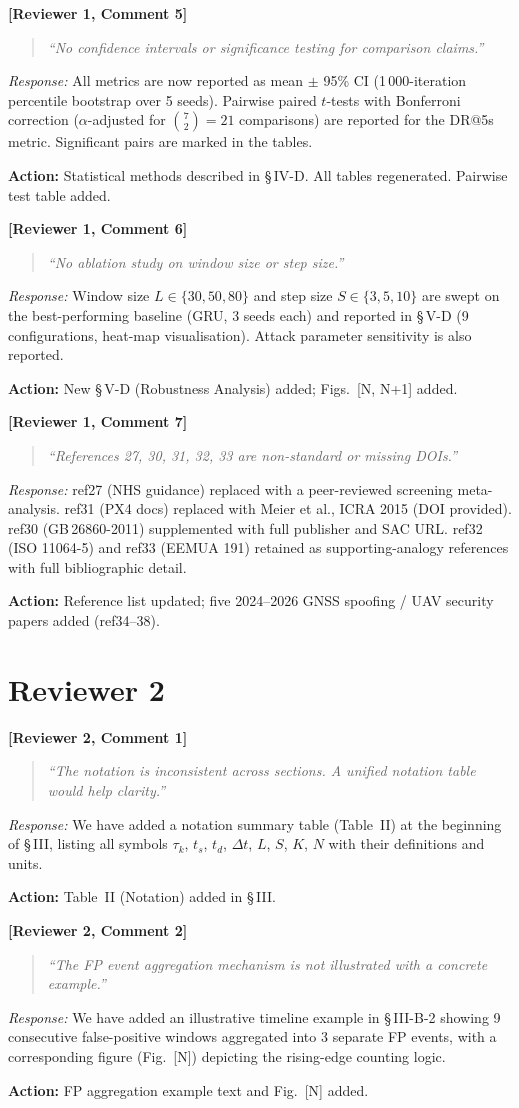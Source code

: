 \documentclass[11pt, a4paper]{article}
\newcommand{\reviewer}[2]{\medskip\noindent\textbf{\textcolor{revcolor}{[Reviewer #1, Comment #2]}}\par}
\newcommand{\response}[1]{\noindent\textit{Response:} #1\par}
\newcommand{\action}[1]{\noindent\textcolor{actcolor}{\textbf{Action:} #1}\smallskip\par}
\newcommand{\quoterev}[1]{\begin{quote}\textit{``#1''}\end{quote}}
\begin{document}
\reviewer{1}{5}
\quoterev{No confidence intervals or significance testing for comparison claims.}
\response{%
  All metrics are now reported as mean $\pm$ 95\% CI (1\,000-iteration
  percentile bootstrap over 5 seeds). Pairwise paired $t$-tests with Bonferroni
  correction ($\alpha$-adjusted for $\binom{7}{2}=21$ comparisons) are reported
  for the DR@5s metric. Significant pairs are marked in the tables.}
\action{Statistical methods described in \S\,IV-D. All tables regenerated.
  Pairwise test table added.}

\reviewer{1}{6}
\quoterev{No ablation study on window size or step size.}
\response{%
  Window size $L\in\{30,50,80\}$ and step size $S\in\{3,5,10\}$ are swept
  on the best-performing baseline (GRU, 3 seeds each) and reported in
  \S\,V-D (9 configurations, heat-map visualisation). Attack parameter
  sensitivity is also reported.}
\action{New \S\,V-D (Robustness Analysis) added; Figs.~[N, N+1] added.}

\reviewer{1}{7}
\quoterev{References 27, 30, 31, 32, 33 are non-standard or missing DOIs.}
\response{%
  ref27 (NHS guidance) replaced with a peer-reviewed screening meta-analysis.
  ref31 (PX4 docs) replaced with Meier et al., ICRA 2015 (DOI provided).
  ref30 (GB\,26860-2011) supplemented with full publisher and SAC URL.
  ref32 (ISO 11064-5) and ref33 (EEMUA 191) retained as supporting-analogy
  references with full bibliographic detail.}
\action{Reference list updated; five 2024--2026 GNSS spoofing / UAV security
  papers added (ref34--38).}

\section*{Reviewer 2}

\reviewer{2}{1}
\quoterev{The notation is inconsistent across sections. A unified notation table
  would help clarity.}
\response{%
  We have added a notation summary table (Table~II) at the beginning of \S\,III,
  listing all symbols $\tau_k$, $t_s$, $t_d$, $\Delta t$, $L$, $S$, $K$, $N$
  with their definitions and units.}
\action{Table~II (Notation) added in \S\,III.}

\reviewer{2}{2}
\quoterev{The FP event aggregation mechanism is not illustrated with a concrete
  example.}
\response{%
  We have added an illustrative timeline example in \S\,III-B-2 showing
  9 consecutive false-positive windows aggregated into 3 separate FP events,
  with a corresponding figure (Fig.~[N]) depicting the rising-edge counting
  logic.}
\action{FP aggregation example text and Fig.~[N] added.}
\end{document}
